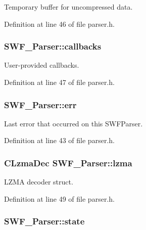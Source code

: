 Temporary buffer for uncompressed data. 



Definition at line 46 of file parser.\-h.

\hypertarget{struct_s_w_f___parser_a7ac999619795fa6e6bb4132af080eae6}{
\subsubsection[{callbacks}]{ S\-W\-F\-\_\-\-Parser\-::callbacks}}\label{struct_s_w_f___parser_a7ac999619795fa6e6bb4132af080eae6}


User-\/provided callbacks. 



Definition at line 47 of file parser.\-h.

\hypertarget{struct_s_w_f___parser_a228c1268386d125a52e25b11f576a60d}{
\subsubsection[{err}]{ S\-W\-F\-\_\-\-Parser\-::err}}\label{struct_s_w_f___parser_a228c1268386d125a52e25b11f576a60d}


Last error that occurred on this S\-W\-F\-Parser. 



Definition at line 43 of file parser.\-h.

\hypertarget{struct_s_w_f___parser_a1bbb269f3afac19005232a222d87d054}{
\subsubsection[{lzma}]{\setlength{\rightskip}{0pt plus 5cm}C\-Lzma\-Dec S\-W\-F\-\_\-\-Parser\-::lzma}}\label{struct_s_w_f___parser_a1bbb269f3afac19005232a222d87d054}


L\-Z\-M\-A decoder struct. 



Definition at line 49 of file parser.\-h.

\hypertarget{struct_s_w_f___parser_aeebc37448b1cdf66f228a06a53c483e9}{
\subsubsection[{state}]{ S\-W\-F\-\_\-\-Parser\-::state}}\label{struct_s_w_f___parser_aeebc37448b1cdf66f228a06a53c483e9}


